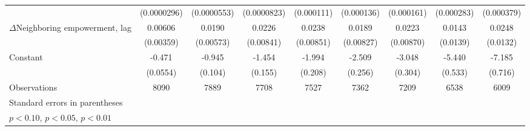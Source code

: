 \begin{table}[htbp]
\begin{tabular}{l*{8}{c}}
                    & (0.0000296)         & (0.0000553)         & (0.0000823)         &  (0.000111)         &  (0.000136)         &  (0.000161)         &  (0.000283)         &  (0.000379)         \\
[1em]
$\Delta$Neighboring  empowerment, lag&     0.00606\sym{*}  &      0.0190\sym{***}&      0.0226\sym{***}&      0.0238\sym{***}&      0.0189\sym{**} &      0.0223\sym{**} &      0.0143         &      0.0248\sym{*}  \\
                    &   (0.00359)         &   (0.00573)         &   (0.00841)         &   (0.00851)         &   (0.00827)         &   (0.00870)         &    (0.0139)         &    (0.0132)         \\
[1em]
Constant            &      -0.471\sym{***}&      -0.945\sym{***}&      -1.454\sym{***}&      -1.994\sym{***}&      -2.509\sym{***}&      -3.048\sym{***}&      -5.440\sym{***}&      -7.185\sym{***}\\
                    &    (0.0554)         &     (0.104)         &     (0.155)         &     (0.208)         &     (0.256)         &     (0.304)         &     (0.533)         &     (0.716)         \\
\hline
Observations        &        8090         &        7889         &        7708         &        7527         &        7362         &        7209         &        6538         &        6009         \\
\hline\hline
\multicolumn{9}{l}{\footnotesize Standard errors in parentheses}\\
\multicolumn{9}{l}{\footnotesize \sym{*} \(p<0.10\), \sym{**} \(p<0.05\), \sym{***} \(p<0.01\)}\\
\end{tabular}
\end{table}

